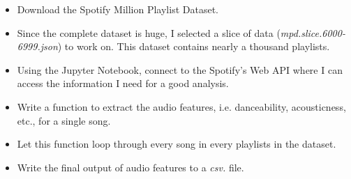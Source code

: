 \documentclass[12pt]{article}
\theoremstyle{plain}
\theoremstyle{definition}
\theoremstyle{remark}
\begin{document}
\begin{itemize}
    \item Download the Spotify Million Playlist Dataset.
    \item Since the complete dataset is huge, I selected a slice of data (\textit{mpd.slice.6000-6999.json}) to work on. This dataset contains nearly a thousand playlists.
    \item Using the Jupyter Notebook, connect to the Spotify’s Web API where I can access the information I need for a good analysis. 
    \item Write a function to extract the audio features, i.e. danceability, acousticness, etc., for a single song.
    \item Let this function loop through every song in every playlists in the dataset.
    \item Write the final output of audio features to a \textit{csv.} file.
\end{itemize}
\end{document}
